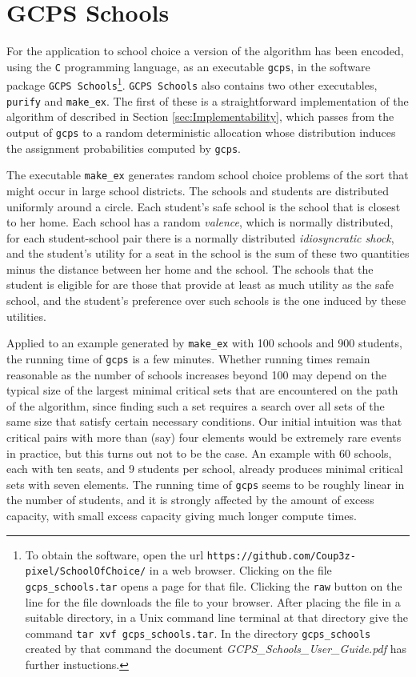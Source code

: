 \documentclass[12pt]{article}
\theoremstyle{definition}
\begin{document}
\section{GCPS Schools} \label{sec:GCPSSchools}

For the application to school choice a version of the algorithm has been encoded, using the \texttt{C} programming language, as an executable \texttt{gcps}, in the software package \texttt{GCPS Schools}\footnote{To obtain the software, open the url \texttt{https://github.com/Coup3z-pixel/SchoolOfChoice/} in a web browser.  Clicking on the file \texttt{gcps\_schools.tar} opens a page for that file.  Clicking the \texttt{raw} button on the line for the file downloads the file to your browser.  After placing the file in a suitable directory, in a Unix command line terminal at that directory give the command \texttt{tar xvf gcps\_schools.tar}.  In the directory \texttt{gcps\_schools} created by that command the document \emph{GCPS\_Schools\_User\_Guide.pdf} has further instuctions.}.  \texttt{GCPS Schools} also contains two other executables, \texttt{purify} and \texttt{make\_ex}.  The first of these is a straightforward implementation of the algorithm of \cite{bckm13aer} described in Section \ref{sec:Implementability}, which passes from the output of \texttt{gcps} to a random deterministic allocation whose distribution induces the assignment probabilities computed by \texttt{gcps}.  

The executable \texttt{make\_ex} generates random school choice problems of the sort that might occur in large school districts.  The schools and students are distributed uniformly around a circle.  Each student's safe school is the school that is closest to her home.  Each school has a random \emph{valence}, which is normally distributed, for each student-school pair there is a normally distributed \emph{idiosyncratic shock}, and the student's utility for a seat in the school is the sum of these two quantities minus the distance between her home and the school.  The schools that the student is eligible for are those that provide at least as much utility as the safe school, and the student's preference over such schools is the one induced by these utilities.

Applied to an example generated by \texttt{make\_ex} with 100 schools and 900 students, the running time of \texttt{gcps} is a few minutes.  Whether running times remain reasonable as the number of schools increases beyond 100 may depend on the typical size of the largest minimal critical sets that are encountered on the path of the algorithm, since finding such a set requires a search over all sets of the same size that satisfy certain necessary conditions.  
Our initial intuition was that critical pairs with more than (say) four elements would be extremely rare events in practice, but this turns out not to be the case.  An example with 60 schools, each with ten seats, and 9 students per school, already produces minimal critical sets with seven elements.    The running time of \texttt{gcps} seems to be roughly linear in the number of students, and it is strongly affected by the amount of excess capacity, with small excess capacity giving much longer compute times.
\end{document}
